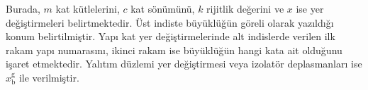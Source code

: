 Burada, $m$ kat kütlelerini, $c$ kat sönümünü, $k$ rijitlik değerini
ve $x$ ise yer değiştirmeleri belirtmektedir. Üst indiste büyüklüğün
göreli olarak yazıldığı konum belirtilmiştir. Yapı kat yer değiştirmelerinde
alt indislerde verilen ilk rakam yapı numarasını, ikinci rakam ise
büyüklüğün hangi kata ait olduğunu işaret etmektedir. Yalıtım düzlemi
yer değiştirmesi veya izolatör deplasmanları ise $x_{\text{b}}^{\text{g}}$
ile verilmiştir.
